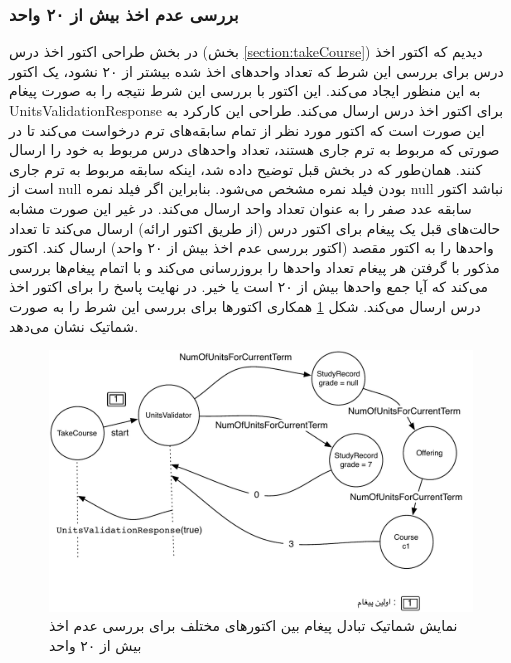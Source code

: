 \FloatBarrier
\subsubsection{بررسی عدم اخذ بیش از ۲۰ واحد}
در بخش طراحی اکتور اخذ درس (بخش \ref{section:takeCourse}) دیدیم که اکتور اخذ درس برای بررسی این شرط که تعداد واحدهای اخذ شده بیشتر از ۲۰ نشود، یک اکتور به این منظور ایجاد می‌کند. این اکتور با بررسی این شرط نتیجه را به صورت پیغام UnitsValidationResponse برای اکتور اخذ درس ارسال می‌کند. طراحی این کارکرد به این صورت است که اکتور مورد نظر از تمام سابقه‌های ترم درخواست می‌کند تا در صورتی که مربوط به ترم جاری هستند، تعداد واحدهای درس مربوط به خود را ارسال کنند. همان‌طور که در بخش قبل توضیح داده شد، اینکه سابقه مربوط به ترم جاری است از null بودن فیلد نمره مشخص می‌شود. بنابراین اگر فیلد نمره null نباشد اکتور سابقه عدد صفر را به عنوان تعداد واحد ارسال می‌کند. در غیر این صورت مشابه‌ حالت‌های قبل یک پیغام برای اکتور درس (از طریق اکتور ارائه) ارسال می‌کند تا تعداد واحدها را به اکتور مقصد (اکتور بررسی عدم اخذ بیش از ۲۰ واحد) ارسال کند. اکتور مذکور با گرفتن هر پیغام تعداد واحدها را بروزرسانی می‌کند و با اتمام پیغام‌ها بررسی می‌کند که آیا جمع واحدها بیش از ۲۰ است یا خیر. در نهایت پاسخ را برای اکتور اخذ درس ارسال می‌کند. شکل \ref{fig:take_course_units} همکاری اکتورها برای بررسی این  شرط را به صورت شماتیک نشان می‌دهد.

\begin{figure}
    \begin{center}
	\includegraphics[width=14cm]{4-ProposedFramework/Figures/NumOfUnits.pdf}
    \end{center}
    \caption{\label{fig:take_course_units}نمایش شماتیک تبادل پیغام بین اکتورهای مختلف برای بررسی عدم اخذ بیش از ۲۰ واحد}
\end{figure}



